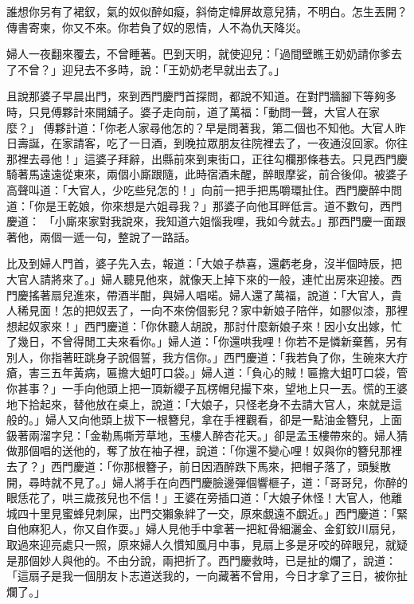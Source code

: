 誰想你另有了裙釵，氣的奴似醉如癡，斜倚定幃屏故意兒猜，不明白。怎生丟開？傳書寄柬，你又不來。你若負了奴的恩情，人不為仇天降災。

婦人一夜翻來覆去，不曾睡著。巴到天明，就使迎兒：「過間壁瞧王奶奶請你爹去了不曾？」迎兒去不多時，說：「王奶奶老早就出去了。」

且說那婆子早晨出門，來到西門慶門首探問，都說不知道。在對門牆腳下等夠多時，只見傅夥計來開舖子。婆子走向前，道了萬福：「動問一聲，大官人在家麼？」 傅夥計道：「你老人家尋他怎的？早是問著我，第二個也不知他。大官人昨日壽誕，在家請客，吃了一日酒，到晚拉眾朋友往院裡去了，一夜通沒回家。你往那裡去尋他！」這婆子拜辭，出縣前來到東街口，正往勾欄那條巷去。只見西門慶騎著馬遠遠從東來，兩個小廝跟隨，此時宿酒未醒，醉眼摩娑，前合後仰。被婆子高聲叫道：「大官人，少吃些兒怎的！」向前一把手把馬嚼環扯住。西門慶醉中問道：「你是王乾娘，你來想是六姐尋我？」那婆子向他耳畔低言。道不數句，西門慶道： 「小廝來家對我說來，我知道六姐惱我哩，我如今就去。」那西門慶一面跟著他，兩個一遞一句，整說了一路話。

比及到婦人門首，婆子先入去，報道：「大娘子恭喜，還虧老身，沒半個時辰，把大官人請將來了。」婦人聽見他來，就像天上掉下來的一般，連忙出房來迎接。西門慶搖著扇兒進來，帶酒半酣，與婦人唱喏。婦人還了萬福，說道：「大官人，貴人稀見面！怎的把奴丟了，一向不來傍個影兒？家中新娘子陪伴，如膠似漆，那裡想起奴家來！」西門慶道：「你休聽人胡說，那討什麼新娘子來！因小女出嫁，忙了幾日，不曾得閒工夫來看你。」婦人道：「你還哄我哩！你若不是憐新棄舊，另有別人，你指著旺跳身子說個誓，我方信你。」西門慶道：「我若負了你，生碗來大疔瘡，害三五年黃病，匾擔大蛆叮口袋。」婦人道：「負心的賊！匾擔大蛆叮口袋，管你甚事？」一手向他頭上把一頂新纓子瓦楞帽兒撮下來，望地上只一丟。慌的王婆地下拾起來，替他放在桌上，說道：「大娘子，只怪老身不去請大官人，來就是這般的。」婦人又向他頭上拔下一根簪兒，拿在手裡觀看，卻是一點油金簪兒，上面鈒著兩溜字兒：「金勒馬嘶芳草地，玉樓人醉杏花天。」卻是孟玉樓帶來的。婦人猜做那個唱的送他的，奪了放在袖子裡，說道：「你還不變心哩！奴與你的簪兒那裡去了？」西門慶道：「你那根簪子，前日因酒醉跌下馬來，把帽子落了，頭髮散開，尋時就不見了。」婦人將手在向西門慶臉邊彈個響榧子，道：「哥哥兒，你醉的眼恁花了，哄三歲孩兒也不信！」王婆在旁插口道：「大娘子休怪！大官人，他離城四十里見蜜蜂兒刺屎，出門交獺象絆了一交，原來覷遠不覷近。」西門慶道：「緊自他麻犯人，你又自作耍。」婦人見他手中拿著一把紅骨細灑金、金釘鉸川扇兒，取過來迎亮處只一照，原來婦人久慣知風月中事，見扇上多是牙咬的碎眼兒，就疑是那個妙人與他的。不由分說，兩把折了。西門慶救時，已是扯的爛了，說道：「這扇子是我一個朋友卜志道送我的，一向藏著不曾用，今日才拿了三日，被你扯爛了。」

